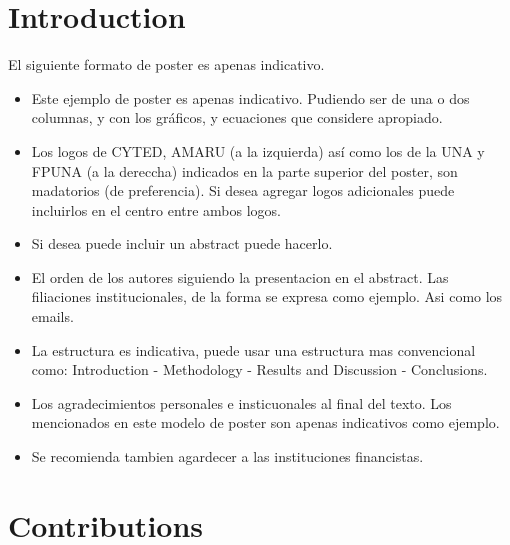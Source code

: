 \documentclass[portrait]{Hylangtechposter}
\begin{document}
\begin{multicols}{2} %

  \color{black}
  
\section*{Introduction}

El siguiente formato de poster es apenas indicativo. 

\begin{itemize}

    \item Este ejemplo de poster es apenas indicativo. Pudiendo ser de una o dos columnas, y con los gr\'aficos, y ecuaciones que considere apropiado.  

    \item Los logos de CYTED, AMARU (a la izquierda) as\'i como los de la UNA y FPUNA (a la dereccha) indicados en la parte superior del poster, son madatorios (de preferencia). Si desea agregar logos adicionales puede incluirlos en el centro entre ambos logos. 

    \item Si desea puede incluir un abstract puede hacerlo.

    \item El orden de los autores siguiendo la presentacion en el abstract. Las filiaciones institucionales, de la forma se expresa como ejemplo. Asi como los emails. 

    \item La estructura es indicativa, puede usar una estructura mas convencional como: Introduction - Methodology - Results and Discussion - Conclusions. 

    \item Los agradecimientos personales e insticuonales al final del texto. Los mencionados en este modelo de poster son apenas indicativos como ejemplo. 
    
    \item Se recomienda tambien agardecer a las instituciones financistas. 
    
\end{itemize}



\section*{Contributions}



\end{multicols}
\end{document}
